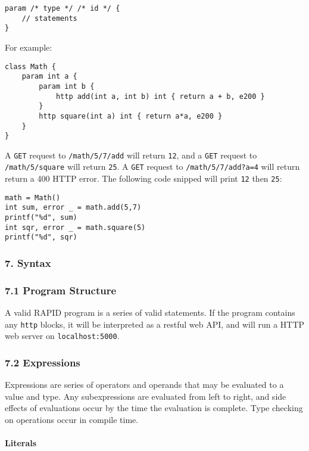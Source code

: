 \begin{verbatim}
param /* type */ /* id */ {
    // statements
}
\end{verbatim}

For example:

\begin{verbatim}
class Math {
    param int a {
        param int b {
            http add(int a, int b) int { return a + b, e200 }
        }
        http square(int a) int { return a*a, e200 }
    }
}
\end{verbatim}

A \texttt{GET} request to \texttt{/math/5/7/add} will return
\texttt{12}, and a \texttt{GET} request to \texttt{/math/5/square} will
return \texttt{25}. A \texttt{GET} request to \texttt{/math/5/7/add?a=4}
will return return a 400 HTTP error. The following code snipped will
print \texttt{12} then \texttt{25}:

\begin{verbatim}
math = Math()
int sum, error _ = math.add(5,7)
printf("%d", sum)
int sqr, error _ = math.square(5)
printf("%d", sqr)
\end{verbatim}

\subsubsection{7. Syntax}\label{syntax}

\subsubsection{7.1 Program Structure}\label{program-structure}

A valid RAPID program is a series of valid statements. If the program
contains any \texttt{http} blocks, it will be interpreted as a restful
web API, and will run a HTTP web server on \texttt{localhost:5000}.

\subsubsection{7.2 Expressions}\label{expressions}

Expressions are series of operators and operands that may be evaluated
to a value and type. Any subexpressions are evaluated from left to
right, and side effects of evaluations occur by the time the evaluation
is complete. Type checking on operations occur in compile time.

\paragraph{Literals}\label{literals-1}

